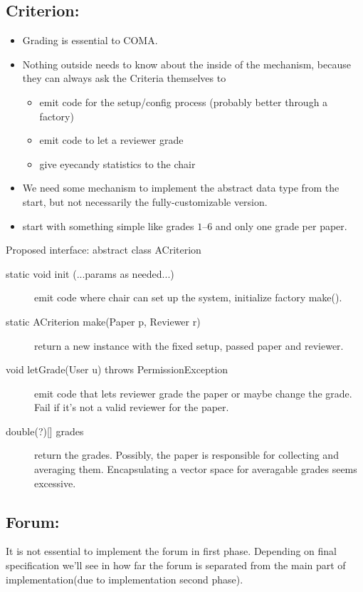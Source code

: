 \documentclass[a4paper]{article}
\begin{document}
  \subsection{Criterion:}\label{sec:1:criterion}
  \begin{itemize}
  \item Grading is essential to COMA.
  \item Nothing outside needs to know about the inside of the
    mechanism, because they can always ask the Criteria themselves to
    \begin{itemize}
    \item emit code for the setup/config process (probably better through
      a factory)
    \item emit code to let a reviewer grade
    \item give eyecandy statistics to the chair
    \end{itemize}
  \item We need some mechanism to implement the abstract data type
    from the start, but not necessarily the fully-customizable
    version.
  \item start with something simple like grades $1$--$6$ and only one
    grade per paper.
  
  \end{itemize}
%
  Proposed interface:
  abstract class ACriterion 
  \begin{description}
  \item [static void init (...params as needed...)] emit code where
    chair can set up the system, initialize factory make().
  \item [static ACriterion make(Paper p, Reviewer r)] return a new
    instance with the fixed setup, passed paper and reviewer.
  \item [void letGrade(User u) throws PermissionException] emit code
    that lets reviewer grade the paper or maybe change the grade. Fail
    if it's not a valid reviewer for the paper.
  \item [{double(?)[] grades}] return the grades. Possibly, the paper
    is responsible for collecting and averaging them. Encapsulating a
    vector space for averagable grades seems excessive.
  \end{description}
   \subsection{Forum:}\label{sec:1:forum}
 It is not essential to implement the forum in first phase. Depending on final specification we'll see in how far the forum is separated from the main part of implementation(due to implementation second phase).
\end{document}
